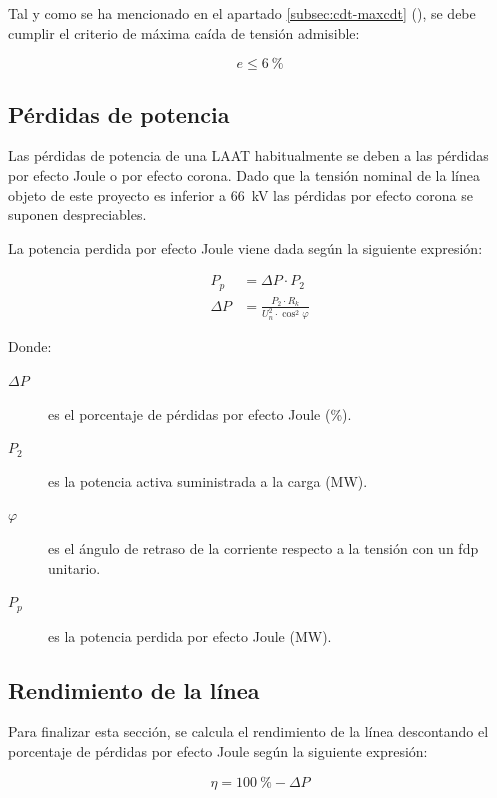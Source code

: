 Tal y como se ha mencionado en el apartado \ref{subsec:cdt-maxcdt} (), se debe cumplir el criterio de máxima caída de tensión admisible:

\begin{equation}
\label{eq:cdt-criterio-maxcdt}
e \leq \SI{6}{\percent}
\end{equation}

\subsection{Pérdidas de potencia}
\label{subsec:ce-perdidaPotencia}
Las pérdidas de potencia de una \ac{LAAT} habitualmente se deben a las pérdidas por efecto Joule o por efecto corona. Dado que la tensión nominal de la línea objeto de este proyecto es inferior a \SI{66}{\kilo\volt} las pérdidas por efecto corona se suponen despreciables.

La potencia perdida por efecto Joule viene dada según la siguiente expresión:

\begin{align}
P_p &= \Delta P \cdot P_2
\label{eq:cdt-deltaP} \\[0.5em]
\Delta P &= \frac{P_2 \cdot R_k}{U_n^2 \cdot \cos^2{\varphi}}
\label{eq:cdt-Pp}
\end{align}

Donde:
\begin{description}
  \item[$\Delta P$] es el porcentaje de pérdidas por efecto Joule (\si{\percent}).
  \item[$P_2$] es la potencia activa suministrada a la carga (\si{\mega\watt}).
  \item[$\varphi$] es el ángulo de retraso de la corriente respecto a la tensión con un \ac{fdp} unitario.
  \item[$P_p$] es la potencia perdida por efecto Joule (\si{\mega\watt}).
\end{description}

\subsection{Rendimiento de la línea}
\label{subsec:ce-rendimiento}
Para finalizar esta sección, se calcula el rendimiento de la línea descontando el porcentaje de pérdidas por efecto Joule según la siguiente expresión:

\begin{equation}
\eta = \SI{100}{\percent} - \Delta P
\label{eq:cdt-rendimiento}
\end{equation}

